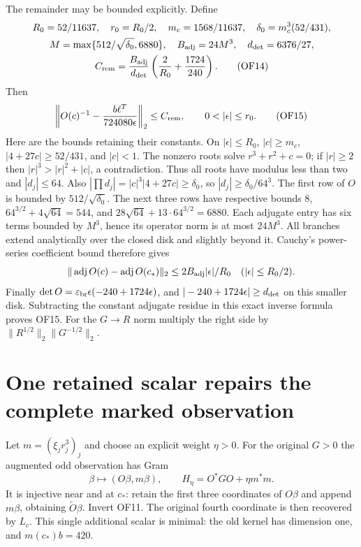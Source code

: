 \documentclass[11pt]{article}
\begin{document}
The remainder may be bounded explicitly. Define
\begin{gather}
 R_0=52/11637,\quad r_0=R_0/2,\quad m_c=1568/11637,
 \quad\delta_0=m_c^3(52/431),\notag\\
 M=\max\{512/\sqrt{\delta_0},6880\},\quad B_{
 \rm adj}=24M^3,\quad d_{\rm det}=6376/27,\notag\\
 C_{\rm rem}=\frac{B_{\rm adj}}{d_{\rm det}}
                   \left(\frac2{R_0}+\frac{1724}{240}\right).
 \tag{OF14}
\end{gather}
Then
\begin{equation}
 \left\|O(c)^{-1}-\frac{b\ell^T}{724080\epsilon}\right\|_2
 \le C_{\rm rem},\qquad 0<|\epsilon|\le r_0.\tag{OF15}
\end{equation}
Here are the bounds retaining their constants. On $|\epsilon|\le R_0$,
$|c|\ge m_c$, $|4+27c|\ge52/431$, and $|c|<1$.
The nonzero roots solve $r^3+r^2+c=0$; if $|r|\ge2$ then
$|r|^3>|r|^2+|c|$, a contradiction. Thus all roots have modulus
less than two and $|d_j|\le64$. Also
$|\prod d_j|=|c|^3|4+27c|\ge\delta_0$, so
$|d_j|\ge\delta_0/64^3$. The first row of $O$ is bounded by
$512/\sqrt{\delta_0}$. The next three rows have respective bounds
$8$, $64^{3/2}+4\sqrt{64}=544$, and
$28\sqrt{64}+13\cdot64^{3/2}=6880$. Each adjugate entry has six
terms bounded by $M^3$, hence its operator norm is at most $24M^3$.
All branches extend analytically over the closed disk and slightly
beyond it. Cauchy's power-series coefficient bound therefore gives
\[
 \|\operatorname{adj}O(c)-\operatorname{adj}O(c_*)\|_2
 \le 2B_{\rm adj}|\epsilon|/R_0\quad(|\epsilon|\le R_0/2).
\]
Finally $\det O=\varepsilon_{\rm br}\epsilon(-240+1724\epsilon)$,
and $|-240+1724\epsilon|\ge d_{\rm det}$ on this smaller disk.
Subtracting the constant adjugate residue in this exact inverse
formula proves OF15. For the $G\to R$ norm multiply the right side
by $\|R^{1/2}\|_2\|G^{-1/2}\|_2$.

\section{One retained scalar repairs the complete marked observation}
Let $m=(\xi_jr_j^3)_j$ and choose an explicit weight $\eta>0$.
For the original $G>0$ the augmented odd observation has Gram
\begin{equation}
 \beta\longmapsto (O\beta,m\beta),\qquad
 H_\eta=O^*GO+\eta m^*m.\tag{OF16}
\end{equation}
It is injective near and at $c_*$: retain the first three coordinates
of $O\beta$ and append $m\beta$, obtaining $\widetilde O\beta$.
Invert OF11. The original fourth coordinate is then recovered by
$L_c$. This single additional scalar is minimal: the old kernel
has dimension one, and $m(c_*)b=420$.
\end{document}
